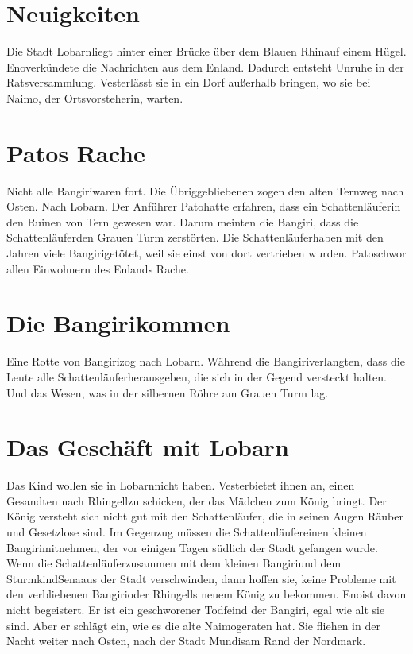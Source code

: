 \documentclass[12pt,a4paper,onecolumn,twoside,ngerman]{book}
\newcommand{\Tern}{Tern }
\newcommand{\Sena}{Sena}
\newcommand{\Sturmkind}{Sturmkind}
\newcommand{\Bangiri}{Bangiri}
\newcommand{\Pato}{Pato}
\newcommand{\Enland}{Enland}
\newcommand{\Schattenlaufer}{Schattenläufer}
\newcommand{\Eno}{Eno}
\newcommand{\Lobarn}{Lobarn}
\newcommand{\Vester}{Vester}
\newcommand{\Naimo}{Naimo}
\newcommand{\Nordmark}{Nordmark}
\newcommand{\Rhingell}{Rhingell}
\newcommand{\Mundis}{Mundis}
\newcommand{\Rhin}{Rhin}
\begin{document}
\section{Neuigkeiten}
Die Stadt \Lobarn liegt hinter einer Brücke über dem Blauen \Rhin auf einem Hügel.
\Eno verkündete die Nachrichten aus dem \Enland. Dadurch entsteht Unruhe in der Ratsversammlung. \Vester lässt sie in ein Dorf außerhalb bringen, wo sie bei \Naimo, der Ortsvorsteherin, warten.

\section{\Pato{s} Rache}
Nicht alle \Bangiri waren fort. Die Übriggebliebenen zogen den alten Ternweg nach Osten. Nach \Lobarn. Der Anführer \Pato hatte erfahren, dass ein \Schattenlaufer in den Ruinen von \Tern gewesen war. Darum meinten die \Bangiri{,} dass die \Schattenlaufer den Grauen Turm zerstörten. Die \Schattenlaufer haben mit den Jahren viele \Bangiri getötet, weil sie einst von dort vertrieben wurden. \Pato schwor allen Einwohnern des \Enland{s} Rache.

\section{Die \Bangiri kommen}
Eine Rotte von \Bangiri zog nach \Lobarn.
Während die \Bangiri verlangten, dass die Leute alle \Schattenlaufer herausgeben, die sich in der Gegend versteckt halten. Und das Wesen, was in der silbernen Röhre am Grauen Turm lag.

\section{Das Geschäft mit \Lobarn}
Das Kind wollen sie in \Lobarn nicht haben. \Vester bietet ihnen an, einen Gesandten nach \Rhingell zu schicken, der das Mädchen zum König bringt. Der König versteht sich nicht gut mit den \Schattenlaufer, die in seinen Augen Räuber und Gesetzlose sind. Im Gegenzug müssen die \Schattenlaufer einen kleinen \Bangiri mitnehmen, der vor einigen Tagen südlich der Stadt gefangen wurde. 
Wenn die \Schattenlaufer zusammen mit dem kleinen \Bangiri und dem \Sturmkind \Sena aus der Stadt verschwinden, dann hoffen sie, keine Probleme mit den verbliebenen \Bangiri oder \Rhingell{s} neuem König zu bekommen. \Eno ist davon nicht begeistert. Er ist ein geschworener Todfeind der \Bangiri{,} egal wie alt sie sind. Aber er schlägt ein, wie es die alte \Naimo geraten hat. Sie fliehen in der Nacht weiter nach Osten, nach der Stadt \Mundis am Rand der \Nordmark.
\end{document}
